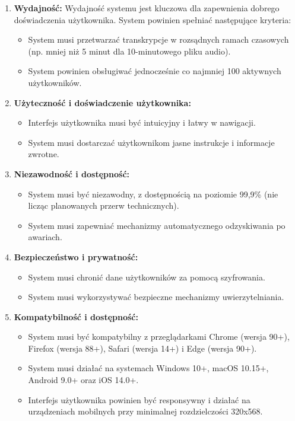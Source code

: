 \documentclass[a4paper,twoside,12pt]{book}
\begin{document}
\begin{enumerate}
	\item \textbf{Wydajność:}
	      Wydajność systemu jest kluczowa dla zapewnienia dobrego doświadczenia użytkownika. System powinien spełniać następujące kryteria:
	      \begin{itemize}
	      	\item System musi przetwarzać transkrypcje w rozsądnych ramach czasowych (np. mniej niż 5 minut dla 10-minutowego pliku audio).
	      	\item System powinien obsługiwać jednocześnie co najmniej 100 aktywnych użytkowników.
	      \end{itemize}
	          
	\item \textbf{Użyteczność i doświadczenie użytkownika:}
	      \begin{itemize}
	      	\item Interfejs użytkownika musi być intuicyjny i łatwy w nawigacji.
	      	\item System musi dostarczać użytkownikom jasne instrukcje i informacje zwrotne.
	      \end{itemize}
	          
	\item \textbf{Niezawodność i dostępność:}
	      \begin{itemize}
	      	\item System musi być niezawodny, z dostępnością na poziomie 99,9\% (nie licząc planowanych przerw technicznych).
	      	\item System musi zapewniać mechanizmy automatycznego odzyskiwania po awariach.
	      \end{itemize}
	          
	\item \textbf{Bezpieczeństwo i prywatność:}
	      \begin{itemize}
	      	\item System musi chronić dane użytkowników za pomocą szyfrowania.
	      	\item System musi wykorzystywać bezpieczne mechanizmy uwierzytelniania.
	      \end{itemize}
	          
  \item \textbf{Kompatybilność i dostępność:}
        \begin{itemize}
          \item System musi być kompatybilny z przeglądarkami Chrome (wersja 90+), Firefox (wersja 88+), Safari (wersja 14+) i Edge (wersja 90+).
          \item System musi działać na systemach Windows 10+, macOS 10.15+, Android 9.0+ oraz iOS 14.0+.
          \item Interfejs użytkownika powinien być responsywny i działać na urządzeniach mobilnych przy minimalnej rozdzielczości 320x568.
        \end{itemize}
\end{enumerate}
\end{document}
